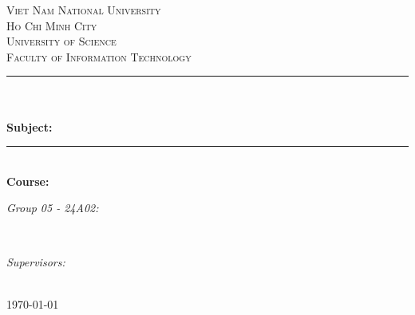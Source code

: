 \begin{titlepage}
\newcommand{\HRule}{\rule{\linewidth}{0.5mm}}
\centering

\textsc{\LARGE Viet Nam National University}\\[0.5cm]
\textsc{\LARGE Ho Chi Minh City}\\[0.5cm]
\textsc{\Large University of Science}\\[0.5cm]
\textsc{\large Faculty of Information Technology}\\[0.5cm]

\HRule \\[0.4cm]
{ 
\huge{\bfseries{\reporttitle}}\\[0.5cm]
\large{\bfseries{Subject: \reportname}}
}\\[0.4cm]
\HRule \\[0.5cm]

\textbf{\large Course: \coursename}\\[0.5cm]

\begin{minipage}[t]{0.5\textwidth} %
\begin{flushleft} \large
\emph{Group 05 - 24A02:}\\
\studentname
\end{flushleft}
\end{minipage}
~
\begin{minipage}[t]{0.4\textwidth} %
\begin{flushright} \large
\emph{Supervisors:} \\
\teachername
\end{flushright}
\end{minipage}\\[1cm]

{\large \today}\\[1cm]


\vfill
\end{titlepage}

